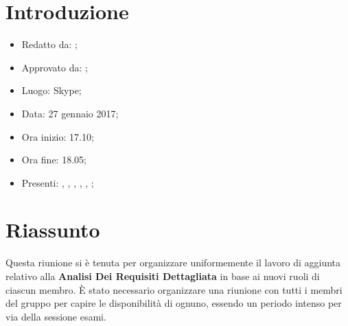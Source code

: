 \section{Introduzione}

	\begin{itemize}
		\item Redatto da: \MC;
		\item Approvato da: \AS;
		\item Luogo: Skype;
		\item Data: 27 gennaio 2017;
		\item Ora inizio: 17.10;
		\item Ora fine: 18.05;
		\item Presenti: \AS, \DS, \MC, \NS, \DAN, \AN;		
	\end{itemize}

\section{Riassunto}
Questa riunione si è tenuta per organizzare uniformemente il lavoro di aggiunta relativo alla \textbf{Analisi Dei Requisiti Dettagliata} in base ai nuovi ruoli di ciascun membro. \`{E} stato necessario organizzare una riunione con tutti i membri del gruppo per capire le disponibilit\`{a} di ognuno, essendo un periodo intenso per via della sessione esami.